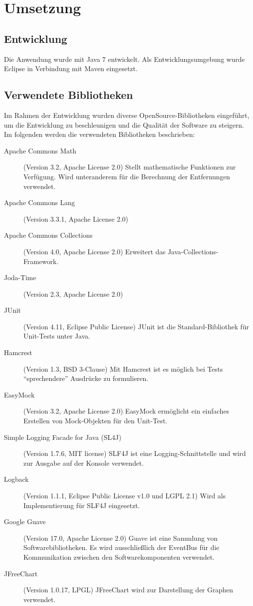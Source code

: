 \section{Umsetzung}
\subsection{Entwicklung}
Die Anwendung wurde mit Java 7 entwickelt. Als Entwicklungsumgebung wurde Eclipse in Verbindung mit Maven eingesetzt. 

\subsection{Verwendete Bibliotheken}
Im Rahmen der Entwicklung wurden diverse OpenSource-Bibliotheken eingeführt, um die Entwicklung zu beschleunigen und die Qualität der Software zu steigern. Im folgenden werden die verwendeten Bibliotheken beschrieben:
\begin{description}
 \item[Apache Commons Math] (Version 3.2, Apache License 2.0) \cite{apache:CommonsMath} Stellt mathematische Funktionen zur Verfügung. Wird unteranderem für die Berechnung der Entfernungen verwendet.
 \item[Apache Commons Lang] (Version 3.3.1, Apache License 2.0) \cite{apache:CommonsLang} %
 \item[Apache Commons Collections] (Version 4.0, Apache License 2.0) \cite{apache:CommonsCollection} Erweitert das Java-Collec\-tions-Framework. 
 \item[Joda-Time] (Version 2.3, Apache License 2.0) \cite{joda:jodatime} %
 \item[JUnit] (Version 4.11, Eclipse Public License) \cite{junit:junit} JUnit ist die Standard-Bibliothek für Unit-Tests unter Java. 
 \item[Hamcrest] (Version 1.3, BSD 3-Clause) \cite{hamcrest:hamcrest} Mit Hamcrest ist es möglich bei Tests "`sprechendere"' Ausdrücke zu formulieren.
 \item[EasyMock] (Version 3.2, Apache License 2.0) \cite{easymock:easymock} EasyMock ermöglicht ein einfaches Erstellen von Mock-Objekten für den Unit-Test.
 \item[Simple Logging Facade for Java (SL4J)] (Version 1.7.6, MIT license) \cite{qos:slfj} SLF4J ist eine Log\-ging-Schnittstelle und wird zur Ausgabe auf der Konsole verwendet.
 \item[Logback] (Version 1.1.1, Eclipse Public License v1.0 und LGPL 2.1) \cite{qos:logback} Wird als Implementierung für SLF4J eingesetzt.
 \item[Google Guave] (Version 17.0, Apache License 2.0) \cite{google:guave} Guave ist eine Sammlung von Softwarebibliotheken. Es wird ausschließlich der EventBus für die Kommunikation zwischen den Softwarekomponenten verwendet.
 \item[JFreeChart] (Version 1.0.17, LPGL) \cite{ObjectRefineryLimited:JFreeChart} JFreeChart wird zur Darstellung der Graphen verwendet.
\end{description}

